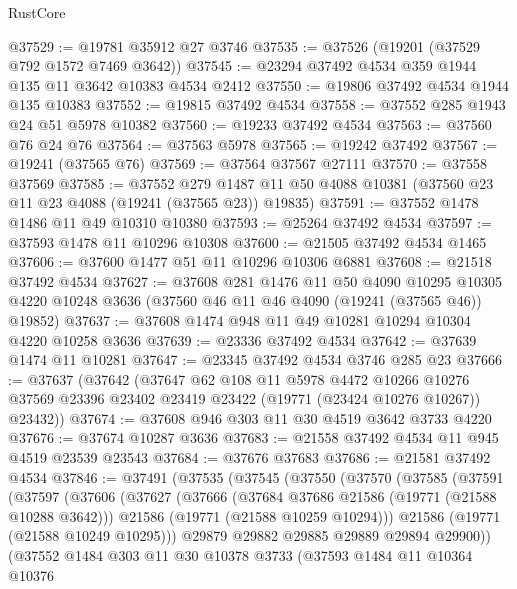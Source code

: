 \begin{lexlean}{RustCore}
\begin{coremodule}
@37529 := @19781 @35912 @27 @3746
@37535 := @37526 (@19201 (@37529 @792 @1572 @7469 @3642))
@37545 := @23294 @37492 @4534 @359 @1944 @135 @11 @3642 @10383 @4534 @2412
@37550 := @19806 @37492 @4534 @1944 @135 @10383
@37552 := @19815 @37492 @4534
@37558 := @37552 @285 @1943 @24 @51 @5978 @10382
@37560 := @19233 @37492 @4534
@37563 := @37560 @76 @24 @76
@37564 := @37563 @5978
@37565 := @19242 @37492
@37567 := @19241 (@37565 @76)
@37569 := @37564 @37567 @27111
@37570 := @37558 @37569
@37585 := @37552
    @279
    @1487
    @11
    @50
    @4088
    @10381
    (@37560 @23 @11 @23 @4088 (@19241 (@37565 @23)) @19835)
@37591 := @37552 @1478 @1486 @11 @49 @10310 @10380
@37593 := @25264 @37492 @4534
@37597 := @37593 @1478 @11 @10296 @10308
@37600 := @21505 @37492 @4534 @1465
@37606 := @37600 @1477 @51 @11 @10296 @10306 @6881
@37608 := @21518 @37492 @4534
@37627 := @37608
    @281
    @1476
    @11
    @50
    @4090
    @10295
    @10305
    @4220
    @10248
    @3636
    (@37560 @46 @11 @46 @4090 (@19241 (@37565 @46)) @19852)
@37637 := @37608 @1474 @948 @11 @49 @10281 @10294 @10304 @4220 @10258 @3636
@37639 := @23336 @37492 @4534
@37642 := @37639 @1474 @11 @10281
@37647 := @23345 @37492 @4534 @3746 @285 @23
@37666 := @37637
    (@37642
      (@37647
        @62
        @108
        @11
        @5978
        @4472
        @10266
        @10276
        @37569
        @23396
        @23402
        @23419
        @23422
        (@19771 (@23424 @10276 @10267))
        @23432))
@37674 := @37608 @946 @303 @11 @30 @4519 @3642 @3733 @4220
@37676 := @37674 @10287 @3636
@37683 := @21558 @37492 @4534 @11 @945 @4519 @23539 @23543
@37684 := @37676 @37683
@37686 := @21581 @37492 @4534
@37846 := @37491
    (@37535
      (@37545
        (@37550
          (@37570
            (@37585
              (@37591
                (@37597
                  (@37606
                    (@37627
                      (@37666
                        (@37684 @37686 @21586 (@19771 (@21588 @10288 @3642)))
                        @21586
                        (@19771 (@21588 @10259 @10294)))
                      @21586
                      (@19771 (@21588 @10249 @10295)))
                    @29879
                    @29882
                    @29885
                    @29889
                    @29894
                    @29900))
                (@37552
                  @1484
                  @303
                  @11
                  @30
                  @10378
                  @3733
                  (@37593
                    @1484
                    @11
                    @10364
                    @10376

\end{coremodule}
\end{lexlean}
